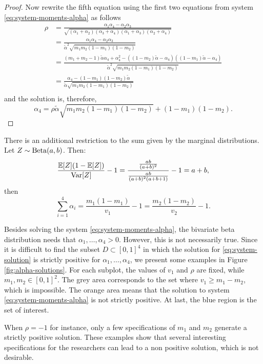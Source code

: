\begin{proof}
Now rewrite the fifth equation using the first two equations from system \eqref{eq:system-moments-alpha} as follows 
\begin{equation}
    \label{eq:rho-equation}
    \begin{split}
        \rho &= \frac{\alpha_1\alpha_4 - \alpha_2\alpha_3}{\sqrt{(\alpha_1+\alpha_2)(\alpha_3+\alpha_4)(\alpha_1+\alpha_3)(\alpha_2+\alpha_4)}} \\ 
        &= \frac{\alpha_1\alpha_4 - \alpha_2\alpha_3}{\tilde{\alpha}^2\sqrt{m_1m_2(1-m_1)(1-m_2)}} \\ 
        &= \frac{(m_1 + m_2 - 1)\tilde{\alpha}\alpha_4 + \alpha_4^2 - ((1-m_2)\tilde{\alpha} - \alpha_4)((1-m_1)\tilde{\alpha} - \alpha_4)}{\tilde{\alpha}^2\sqrt{m_1m_2(1-m_1)(1-m_2)}} \\
        &= \frac{\alpha_4 - (1-m_1)(1-m_2)\tilde{\alpha}}{\tilde{\alpha}\sqrt{m_1m_2(1-m_1)(1-m_2)}} \\ 
    \end{split}
\end{equation}
and the solution is, therefore, 
$$
\alpha_4 = \rho\tilde{\alpha}\sqrt{m_1m_2(1-m_1)(1-m_2)} + (1-m_1)(1-m_2).
$$
\end{proof}

There is an additional restriction to the sum given by the marginal
distributions. Let $Z \sim \operatorname{Beta}(a, b)$. Then: 
$$
\frac{\mathbb{E}[Z](1-\mathbb{E}[Z])}{\operatorname{Var}[Z]} - 1 = \frac{\frac{ab}{(a+b)^2}}{\frac{ab}{(a+b)^2(a+b+1)}}-1 = a+b, 
$$
then 
\begin{equation}
  \label{eq:restriction-sum-alphas}
  \sum_{i=1}^4 \alpha_i = \frac{m_1(1-m_1)}{v_1} - 1 = \frac{m_2(1-m_2)}{v_2} - 1.
\end{equation}

Besides solving the system \eqref{eq:system-moments-alpha}, the bivariate 
beta distribution needs that $\alpha_1, \dots, \alpha_4 > 0$. However, this is not necessarily
true. Since it is difficult to find the subset $D \subset [0,1]^4$ in which
the solution for \eqref{eq:system-solution} is strictly positive for
$\alpha_1, \dots, \alpha_4$, we present some examples in Figure
\ref{fig:alpha-solutions}. For each subplot, the values of $v_1$ and $\rho$
are fixed, while $m_1, m_2 \in [0,1]^2$. The grey area corresponds to the set 
where $v_1 \ge m_1 - m_2$, which is impossible. The orange area means that
the solution to system \eqref{eq:system-moments-alpha} is not strictly
positive. At last, the blue region is the set of interest. 

When $\rho = -1$ for instance, only a few specifications of $m_1$ and $m_2$
generate a strictly positive solution. These examples show that several
interesting specifications for the researchers can lead to a non positive
solution, which is not desirable. 

